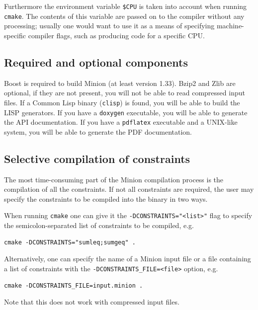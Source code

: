 \documentclass[oneside]{book}
\begin{document}
Furthermore the environment variable \verb+$CPU+ is taken into account when
running \texttt{cmake}. The contents of this variable are passed on to the
compiler without any processing; usually one would want to use it as a means of
specifying machine-specific compiler flags, such as producing code for a
specific CPU.

\subsection{Required and optional components}

Boost is required to build Minion (at least version 1.33). Bzip2 and Zlib are
optional, if they are not present, you will not be able to read compressed input
files. If a Common Lisp binary (\texttt{clisp}) is found, you will be able to
build the LISP generators. If you have a \texttt{doxygen} executable, you will
be able to generate the API documentation. If you have a \texttt{pdflatex}
executable and a UNIX-like system, you will be able to generate the PDF
documentation.

\subsection{Selective compilation of constraints}

The most time-consuming part of the Minion compilation process is the
compilation of all the constraints. If not all constraints are required, the
user may specify the constraints to be compiled into the binary in two ways.

When running \texttt{cmake} one can give it the \verb+-DCONSTRAINTS="<list>"+
flag to specify the semicolon-separated list of constraints to be compiled,
e.g.\
\begin{verbatim}
cmake -DCONSTRAINTS="sumleq;sumgeq" .
\end{verbatim}

Alternatively, one can specify the name of a Minion input file or a file
containing a list of constraints with the \verb+-DCONSTRAINTS_FILE=<file>+
option, e.g.\
\begin{verbatim}
cmake -DCONSTRAINTS_FILE=input.minion .
\end{verbatim}
Note that this does not work with compressed input files.
\end{document}
